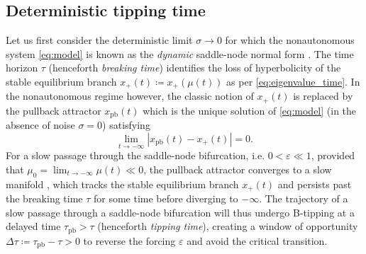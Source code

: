 \documentclass[openacc]{rsproca_new}
\begin{document}
\subsection{Deterministic tipping time}\label{subsec:delay}
Let us first consider the deterministic limit $\sigma\to0$ for which the nonautonomous system \eqref{eq:model} is known as the \emph{dynamic} saddle-node normal form \cite{Berglund2006}.
The time horizon $\tau$ (henceforth \emph{breaking time}) identifies the loss of hyperbolicity of the stable equilibrium branch $x_+(t)\coloneqq x_+(\mu(t))$ as per \eqref{eq:eigenvalue_time}.
In the nonautonomous regime however, the classic notion of $x_+(t)$ is replaced by the pullback attractor $x_{\mathrm{pb}}(t)$ which is the unique solution of \eqref{eq:model} (in the absence of noise $\sigma=0$) satisfying 
%
\begin{equation}\label{eq:pb_attractor}
  \lim_{t\to-\infty}|x_{\mathrm{pb}}(t)-x_+(t)|=0 .
\end{equation}
%
For a slow passage through the saddle-node bifurcation, i.e. $0<\varepsilon\ll1$, provided that $\mu_0=\lim_{t\to-\infty}\mu(t)\ll0$, the pullback attractor converges to a slow manifold \cite[Thm.~$2.1.7$]{Berglund2006}, which tracks the stable equilibrium branch $x_+(t)$ and persists past the breaking time $\tau$ for some time before diverging to $-\infty$.
The trajectory of a slow passage through a saddle-node bifurcation will thus undergo B-tipping at a delayed time $\tau_\mathrm{pb}>\tau$ (henceforth \emph{tipping time}), creating a window of opportunity $\Delta\tau\coloneqq\tau_{\mathrm{pb}}-\tau>0$ to reverse the forcing $\varepsilon$ and avoid the critical transition.
\end{document}
